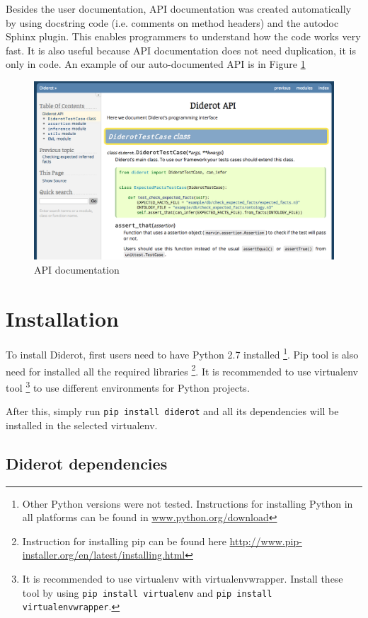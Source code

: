 \documentclass{report}
\begin{document}
Besides the user documentation, API documentation was created automatically by using docstring code (i.e. comments on method headers) and
the autodoc Sphinx plugin.
This enables programmers to understand how the code works very fast.
It is also useful because API documentation does not need duplication, it is only in code.
An example of our auto-documented API is in Figure \ref{figDocs3}

\begin{figure}[!hbt]
    \centering
    \label{figDocs3}
    \caption{API documentation}
    \includegraphics[scale=0.4]{fig/documentation3.png}
\end{figure}


\section{Installation}

To install Diderot, first users need to have Python 2.7 installed \footnote{Other Python versions were not tested. Instructions for installing Python in all platforms can be found in \url{www.python.org/download}}.
Pip tool is also need for installed all the required libraries \footnote{Instruction for installing pip can be found here \url{http://www.pip-installer.org/en/latest/installing.html}}.
It is recommended to use virtualenv tool \footnote{It is recommended to use virtualenv with virtualenvwrapper. Install these tool by using \texttt{pip install virtualenv} and \texttt{pip install virtualenvwrapper}.} to use different environments for Python projects.

After this, simply run \texttt{pip install diderot} and all its dependencies will be installed in the selected virtualenv.

\subsection{Diderot dependencies}
\end{document}

